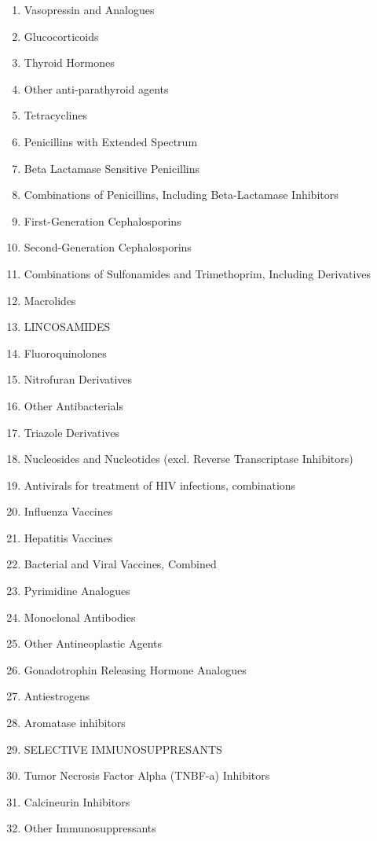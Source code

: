 \documentclass[a4paper,12pt]{article}
\begin{document}
\begin{appendices}
\begin{enumerate}
   			\item Vasopressin and Analogues
   			\item Glucocorticoids
   			\item Thyroid Hormones
   			\item Other anti-parathyroid agents
   			\item Tetracyclines
   			\item Penicillins with Extended Spectrum
   			\item Beta Lactamase Sensitive Penicillins
   			\item Combinations of Penicillins, Including Beta-Lactamase Inhibitors
   			\item First-Generation Cephalosporins
   			\item Second-Generation Cephalosporins
   			\item Combinations of Sulfonamides and Trimethoprim, Including Derivatives
   			\item Macrolides
   			\item LINCOSAMIDES
   			\item Fluoroquinolones
   			\item Nitrofuran Derivatives
   			\item Other Antibacterials
   			\item Triazole Derivatives
   			\item Nucleosides and Nucleotides (excl. Reverse Transcriptase Inhibitors)
   			\item Antivirals for treatment of HIV infections, combinations
   			\item Influenza Vaccines
   			\item Hepatitis Vaccines
   			\item Bacterial and Viral Vaccines, Combined
   			\item Pyrimidine Analogues
   			\item Monoclonal Antibodies
   			\item Other Antineoplastic Agents
   			\item Gonadotrophin Releasing Hormone Analogues
   			\item Antiestrogens
   			\item Aromatase inhibitors
   			\item SELECTIVE IMMUNOSUPPRESANTS
   			\item Tumor Necrosis Factor Alpha (TNBF-a) Inhibitors
   			\item Calcineurin Inhibitors
   			\item Other Immunosuppressants

\end{enumerate}
\end{appendices}
\end{document}
